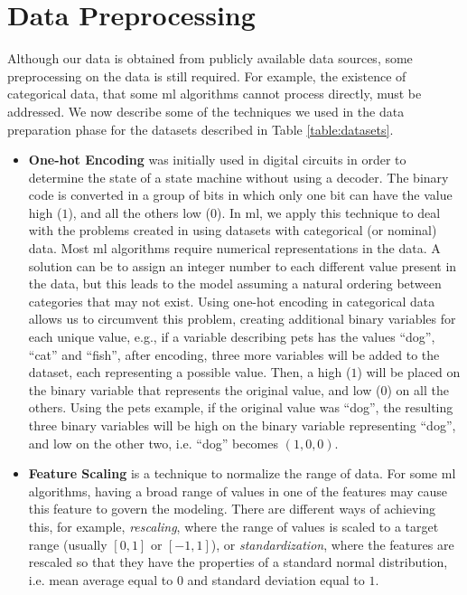 \section{Data Preprocessing}
\label{sec:DataPreProcessingImplementation}

Although our data is obtained from publicly available data sources, some preprocessing on the data is still required.
For example, the existence of categorical data, that some \ac{ml} algorithms cannot process directly, must be addressed. We now describe some of the techniques we used in the data preparation phase for the datasets described in Table \ref{table:datasets}.

\begin{itemize}
    

	\item\textbf{One-hot Encoding}\cite{harris2010digital} was initially used in digital circuits in order to determine the state of a state machine without using a decoder. The binary code is converted in a group of bits in which only one bit can have the value high ($1$), and all the others low ($0$).
	In \ac{ml}, we apply this technique to deal with the problems created in using datasets with categorical (or nominal) data. Most \ac{ml} algorithms require numerical representations in the data. A solution can be to assign an integer number to each different value present in the data, but this leads to the model assuming a natural ordering between categories that may not exist.
	Using one-hot encoding in categorical data allows us to circumvent this problem, creating additional binary variables for each unique value, e.g., if a variable describing pets has the values ``dog'', ``cat'' and ``fish'', after encoding, three more variables will be added to the dataset, each representing a possible value. Then, a high ($1$) will be placed on the binary variable that represents the original value, and low ($0$) on all the others. Using the pets example, if the original value was ``dog'', the resulting three binary variables will be high on the binary variable representing ``dog'', and low on the other two, i.e. ``dog'' becomes $(1,0,0)$.

	\item\textbf{Feature Scaling} is a technique to normalize the range of data. For some \ac{ml} algorithms, having a broad range of values in one of the features may cause this feature to govern the modeling. There are different ways of achieving this, for example, \textit{rescaling}, where the range of values is scaled to a target range (usually $[0,1]$ or $[-1,1]$), or \textit{standardization}, where the features are rescaled so that they have the properties of a standard normal distribution, i.e. mean average equal to $0$ and standard deviation equal to $1$.



\end{itemize}

